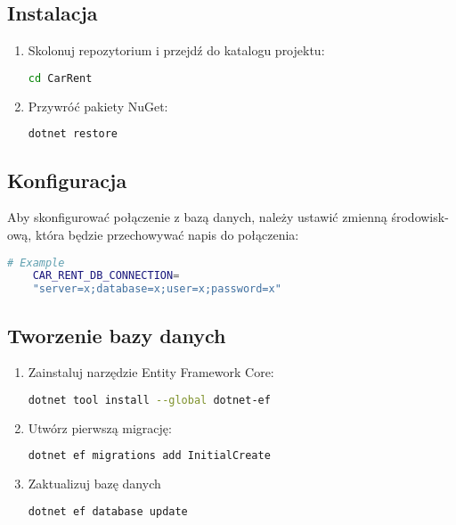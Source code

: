 \documentclass{article}
\begin{document}
\subsection{Instalacja}

\begin{enumerate}
    \item Skolonuj repozytorium i przejdź do katalogu projektu:
    \begin{lstlisting}[language=bash] 
cd CarRent 
    \end{lstlisting}
    \item Przywróć pakiety NuGet:
    \begin{lstlisting}[language=bash] 
dotnet restore
    \end{lstlisting}
\end{enumerate}
\vspace{1em}

\subsection{Konfiguracja}
Aby skonfigurować połączenie z bazą danych, należy ustawić zmienną środowisk-ową, która będzie przechowywać napis do połączenia:

\begin{lstlisting}[language=bash, breaklines=true] 
    # Example
    CAR_RENT_DB_CONNECTION=
    "server=x;database=x;user=x;password=x"
\end{lstlisting}
\vspace{1em}

\subsection{Tworzenie bazy danych}

\begin{enumerate}
    \item Zainstaluj narzędzie Entity Framework Core:
    \begin{lstlisting}[language=bash] 
dotnet tool install --global dotnet-ef
    \end{lstlisting}
    \item Utwórz pierwszą migrację:
    \begin{lstlisting}[language=bash] 
dotnet ef migrations add InitialCreate
    \end{lstlisting}
    \item Zaktualizuj bazę danych
    \begin{lstlisting}[language=bash] 
dotnet ef database update
    \end{lstlisting}
\end{enumerate}
\vspace{1em}
\end{document}
